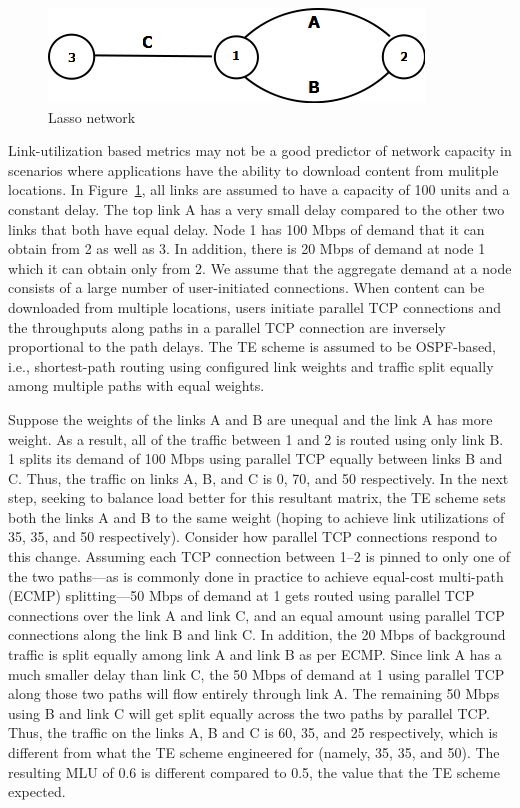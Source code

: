\begin{figure}[tbh]
	\centering
	\label{fig:3node-bg}\includegraphics[scale=0.5]{final_images/Diagram3node.png}
	\caption{Lasso network}
\end{figure}

Link-utilization based metrics may not be a good predictor of network capacity in scenarios where applications have the ability to download content from mulitple locations. In Figure~\ref{fig:3node-bg}, all links are assumed to have a capacity of 100 units and a constant delay. The top link A has a very small delay compared to the other two links that both have equal delay. Node 1 has 100 Mbps of demand that it can obtain from 2 as well as 3. In addition, there is 20 Mbps of demand at node 1 which it can obtain only from 2.  We assume that the aggregate demand at a node consists of a large number of user-initiated connections. When content can be downloaded from multiple locations, users initiate parallel TCP connections and the throughputs along paths in a parallel TCP connection are inversely proportional to the path delays. The TE scheme is assumed to be OSPF-based, i.e., shortest-path routing using configured link weights and traffic split equally among multiple paths with equal weights.


Suppose the weights of the links A and B are unequal and the link A has more weight. As a result, all of the traffic between 1 and 2 is routed using only link B. 1 splits its demand of 100 Mbps using parallel TCP equally between links B and C. Thus, the traffic on links A, B, and C is  0, 70, and 50 respectively. In the next step, seeking to balance load better for this resultant matrix, the TE scheme sets both the links A and B to the same weight (hoping to achieve link utilizations of 35, 35, and 50 respectively).  Consider how parallel TCP connections respond to this change.
Assuming each TCP connection between 1--2 is pinned to only one of the two paths---as is commonly done in practice to achieve equal-cost multi-path (ECMP) splitting---50 Mbps of demand at 1 gets routed using parallel TCP connections over the link A and link C, and an equal amount using parallel TCP connections along the link B and link C. In addition, the 20 Mbps of background traffic is split equally among link A and link B as per ECMP.  Since link A has a much smaller delay than link C, the 50 Mbps of demand at 1 using parallel TCP along those two paths will flow entirely through link A. The remaining 50 Mbps using B and link C will get split equally across the two paths by parallel TCP. Thus, the traffic on the links A, B and C is 60, 35, and 25 respectively, which is different from what the TE scheme engineered for (namely, 35, 35, and 50). The resulting MLU of 0.6 is different compared to 0.5, the value that the TE scheme expected. 



